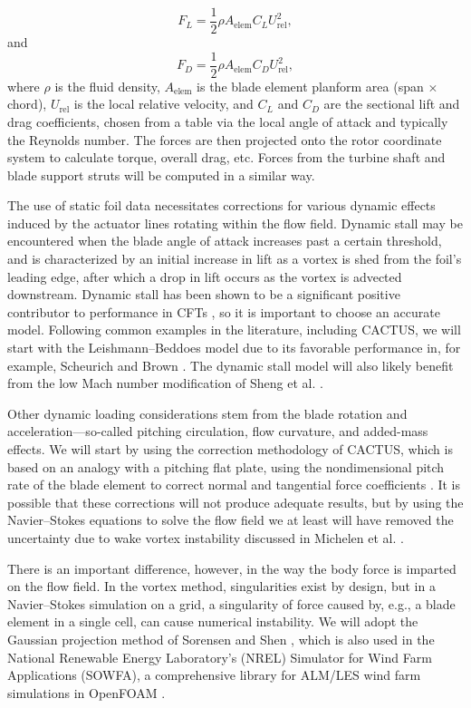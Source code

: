 \begin{equation}
F_L = \frac{1}{2} \rho A_\mathrm{elem} C_L U_\mathrm{rel}^2,
\end{equation}
and
\begin{equation}
F_D = \frac{1}{2} \rho A_\mathrm{elem} C_D U_\mathrm{rel}^2,
\end{equation}
where $\rho$ is the fluid density, $A_\mathrm{elem}$ is the blade element
planform area (span $\times$ chord), $U_\mathrm{rel}$ is the local relative
velocity, and $C_L$ and $C_D$ are the sectional lift and drag coefficients,
chosen from a table via the local angle of attack and typically the Reynolds
number. The forces are then projected onto the rotor coordinate system to
calculate torque, overall drag, etc. Forces from the turbine shaft and blade
support struts will be computed in a similar way.

The use of static foil data necessitates corrections for various dynamic effects
induced by the actuator lines rotating within the flow field. Dynamic stall may
be encountered when the blade angle of attack increases past a certain
threshold, and is characterized by an initial increase in lift as a vortex is
shed from the foil's leading edge, after which a drop in lift occurs as the
vortex is advected downstream. Dynamic stall has been shown to be a significant
positive contributor to performance in CFTs \cite{Para2002, Urbina2013}, so it
is important to choose an accurate model. Following common examples in the
literature, including CACTUS, we will start with the Leishmann--Beddoes model
due to its favorable performance in, for example, Scheurich and Brown
\cite{Scheurich2011}. The dynamic stall model will also likely benefit from the
low Mach number modification of Sheng et al. \cite{Sheng2008}.

Other dynamic loading considerations stem from the blade rotation and
acceleration---so-called pitching circulation, flow curvature, and added-mass
effects. We will start by using the correction methodology of CACTUS, which is
based on an analogy with a pitching flat plate, using the nondimensional pitch
rate of the blade element to correct normal and tangential force coefficients
\cite{Murray2011}. It is possible that these corrections will not produce
adequate results, but by using the Navier--Stokes equations to solve the flow
field we at least will have removed the uncertainty due to wake vortex
instability discussed in Michelen et al. \cite{Michelen2014}.

There is an important difference, however, in the way the body force is imparted
on the flow field. In the vortex method, singularities exist by design, but in a
Navier--Stokes simulation on a grid, a singularity of force caused by, e.g., a
blade element in a single cell, can cause numerical instability. We will adopt
the Gaussian projection method of Sorensen and Shen \cite{Sorensen2002}, which
is also used in the National Renewable Energy Laboratory's (NREL) Simulator for
Wind Farm Applications (SOWFA), a comprehensive library for ALM/LES wind farm
simulations in OpenFOAM \cite{Churchfield2013}.

